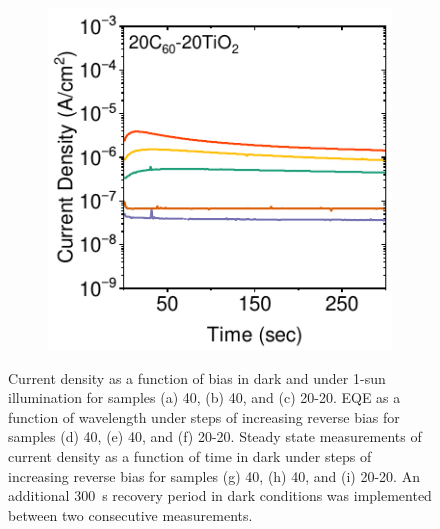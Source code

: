 \begin{figure}[ht!]
\begin{subfigure}[b]{0.32\textwidth}
        \caption{}
    \end{subfigure}
    \hfill
    \begin{subfigure}[b]{0.32\textwidth}
        \centering
        \includegraphics[width=\textwidth]{chapters/transport_layers/images/StaticJV_20_20.pdf}
        \caption{}
    \end{subfigure}

    \caption[Overview of electrical characterization results for PePDs with 40 nm of , 40 nm of , or  20 nm of  and 20 nm of  as the ETL.]{Current density as a function of bias in dark and under 1-sun illumination for samples (a) 40, (b) 40, and (c) 20-20. EQE as a function of wavelength under steps of increasing reverse bias for samples (d) 40, (e) 40, and (f) 20-20. Steady state measurements of current density as a function of time in dark under steps of increasing reverse bias for samples (g) 40, (h) 40, and (i) 20-20. An additional 300~s recovery period in dark conditions was implemented between two consecutive measurements.}
    \label{fig:etl_opt:dynamicjv_eqe_staticjv}
\end{figure}

